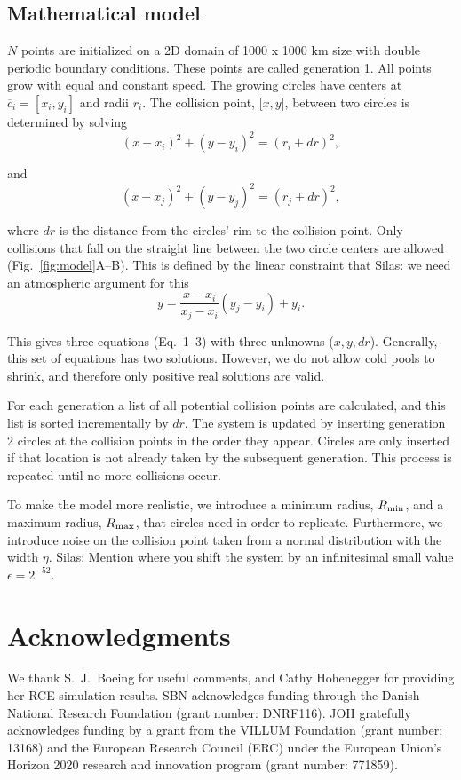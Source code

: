 \documentclass[reprint,amsmath,amssymb]{revtex4-1}
\begin{document}
\subsection{Mathematical model}\label{sec:math_model}
$N$ points are initialized on a 2D domain of 1000 x 1000 km size with double periodic boundary conditions. These points are called generation 1. All points grow with equal and constant speed. The growing circles have centers at $\overline{c}_i=[x_i, y_i]$ and radii $r_i$. The collision point, [$x, y$], between two circles is determined by solving
\begin{equation}
    (x-x_i)^2 + (y-y_i)^2 = (r_i+dr)^2,
\end{equation}

and 
\begin{equation}
    (x-x_j)^2 + (y-y_j)^2 = (r_j+dr)^2,
\end{equation}

where $dr$ is the distance from the circles' rim to the collision point. Only collisions that fall on the straight line between the two circle centers are allowed (Fig.~\ref{fig:model}A--B). This is defined by the linear constraint that {\color{red} Silas: we need an atmospheric argument for this}
\begin{equation}
    y = \frac{x - x_i}{x_j - x_i} (y_j - y_i) + y_i.
\end{equation}

This gives three equations (Eq.~1--3) with three unknowns ($x, y, dr$). Generally, this set of equations has two solutions. However, we do not allow cold pools to shrink, and therefore only positive real solutions are valid.

For each generation a list of all potential collision points are calculated, and this list is sorted incrementally by $dr$. The system is updated by inserting generation 2 circles at the collision points in the order they appear. Circles are only inserted if that location is not already taken by the subsequent generation. This process is repeated until no more collisions occur.

To make the model more realistic, we introduce a minimum radius, $R_{\textnormal{min}}$, and a maximum radius, $R_{\textnormal{max}}$, that circles need in order to replicate. Furthermore, we introduce noise on the collision point taken from a normal distribution with the width $\eta$. {\color{red} Silas: Mention where you shift the system by an infinitesimal small value $\epsilon=2^{-52}$.}

\section*{Acknowledgments}\label{sec:acknowledgments}
We thank S.~J.~Boeing for useful comments, and Cathy Hohenegger for providing her RCE simulation results.
SBN acknowledges funding through the Danish National Research Foundation (grant number: DNRF116).
JOH gratefully acknowledges funding by a grant from the VILLUM Foundation (grant number: 13168) and the European Research Council (ERC) under the European Union's Horizon 2020 research and innovation program (grant number: 771859).
\end{document}
